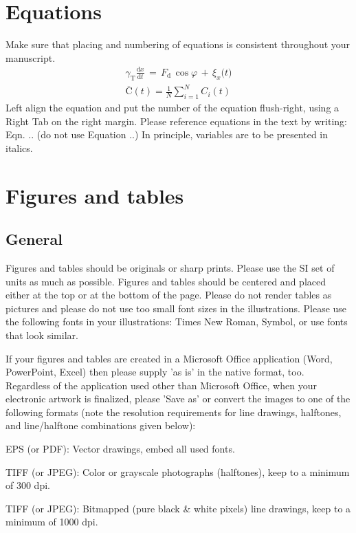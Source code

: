 \documentclass[twocolumn, 10pt]{article}
\begin{document}
\section{Equations}

Make sure that placing and numbering of equations is consistent throughout your manuscript.
\begin{gather}
\label{eq1}
\gamma_{\mbox{T}} \frac{\mbox{d}x}{\mbox{d}t}\,=\,F_{\mbox{d}} \,\cos 
\varphi \,+\,\xi_{x} \mbox{(}t\mbox{)} \\
\label{eq2}
\overline {\mbox{C}} (t)=\frac{1}{N}\sum\limits_{i=1}^N {C_{i} } (t)
\end{gather}
Left align the equation and put the number of the equation flush-right, using a Right Tab on the right margin. Please reference equations in the text by writing: Eqn. .. (do not use Equation ..) In principle, variables are to be presented in italics.


\section{Figures and tables}

\subsection{General}

Figures and tables should be originals or sharp prints. Please use the SI set of units as much as possible. Figures and tables should be centered and placed either at the top or at the bottom of the page. Please do not render tables as pictures and please do not use too small font sizes in the illustrations. Please use the following fonts in your illustrations: Times New Roman, Symbol, or use fonts that look similar.

If your figures and tables are created in a Microsoft Office application (Word, PowerPoint, Excel) then please supply 'as is' in the native format, too. Regardless of the application used other than Microsoft Office, when your electronic artwork is finalized, please 'Save as' or convert the images to one of the following formats (note the resolution requirements for line drawings, halftones, and line/halftone combinations given below): 

EPS (or PDF): Vector drawings, embed all used fonts. 

TIFF (or JPEG): Color or grayscale photographs (halftones), keep to a minimum of 300 dpi. 

TIFF (or JPEG): Bitmapped (pure black {\&} white pixels) line drawings, keep to a minimum of 1000 dpi. 
\end{document}
